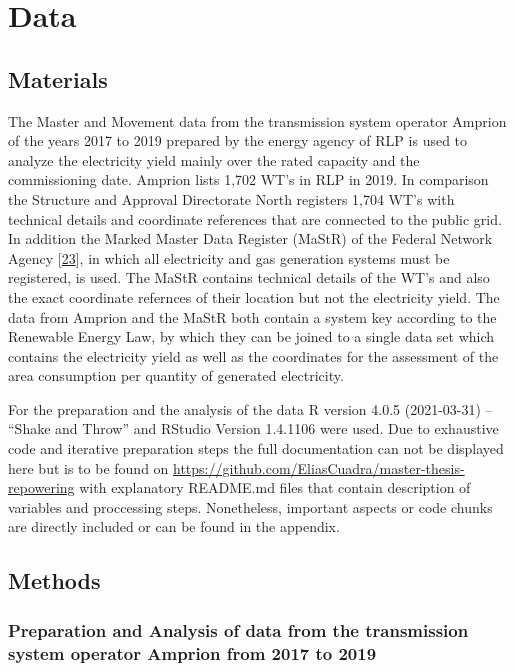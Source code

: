 \documentclass[a4paper,11pt]{article}
\begin{document}
\hypertarget{data}{%
\section{Data}\label{data}}

\hypertarget{materials}{%
\subsection{Materials}\label{materials}}

The Master and Movement data from the transmission system operator Amprion of the years 2017 to 2019 prepared by the energy agency of RLP is used to analyze the electricity yield mainly over the rated capacity and the commissioning date. Amprion lists 1,702 WT's in RLP in 2019. In comparison the Structure and Approval Directorate North registers 1,704 WT's with technical details and coordinate references that are connected to the public grid. In addition the Marked Master Data Register (MaStR) of the Federal Network Agency {[}\protect\hyperlink{ref-Marktstammdatenregister.2020}{23}{]}, in which all electricity and gas generation systems must be registered, is used. The MaStR contains technical details of the WT's and also the exact coordinate refernces of their location but not the electricity yield. The data from Amprion and the MaStR both contain a system key according to the Renewable Energy Law, by which they can be joined to a single data set which contains the electricity yield as well as the coordinates for the assessment of the area consumption per quantity of generated electricity.

For the preparation and the analysis of the data R version 4.0.5 (2021-03-31) -- ``Shake and Throw'' and RStudio Version 1.4.1106 were used. Due to exhaustive code and iterative preparation steps the full documentation can not be displayed here but is to be found on \url{https://github.com/EliasCuadra/master-thesis-repowering} with explanatory README.md files that contain description of variables and proccessing steps. Nonetheless, important aspects or code chunks are directly included or can be found in the appendix.

\hypertarget{methods}{%
\subsection{Methods}\label{methods}}

\hypertarget{preparation-and-analysis-of-data-from-the-transmission-system-operator-amprion-from-2017-to-2019}{%
\subsubsection{Preparation and Analysis of data from the transmission system operator Amprion from 2017 to 2019}\label{preparation-and-analysis-of-data-from-the-transmission-system-operator-amprion-from-2017-to-2019}}
\end{document}
